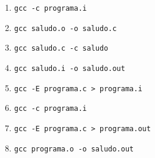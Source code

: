 \begin{enumerate}
  \item \texttt{gcc -c programa.i}
  \item \texttt{gcc saludo.o -o saludo.c}
  \item \texttt{gcc saludo.c -c saludo}
  \item \texttt{gcc saludo.i -o saludo.out}
  \item \texttt{gcc -E programa.c > programa.i}
  \item \texttt{gcc -c programa.i}
  \item \texttt{gcc -E programa.c > programa.out}
  \item \texttt{gcc programa.o -o saludo.out}
\end{enumerate}


